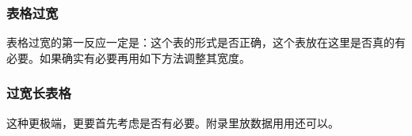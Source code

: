 \subsubsection{表格过宽}
表格过宽的第一反应一定是：这个表的形式是否正确，这个表放在这里是否真的有必要。如果确实有必要再用如下方法调整其宽度。

\begin{table}[!ht]
    \centering
    \caption{过宽表格}
    \label{tab:toowide}
\end{table}

\subsubsection{过宽长表格}
这种更极端，更要首先考虑是否有必要。附录里放数据用用还可以。

